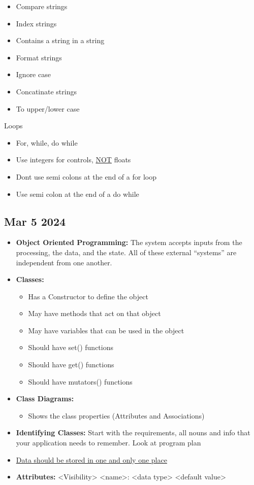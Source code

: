 \documentclass[12pt]{article}
\begin{document}
\begin{itemize}
			\item Compare strings 
			\item Index strings
			\item Contains a string in a string
			\item Format strings
			\item Ignore case
			\item Concatinate strings
			\item To upper/lower case
\end{itemize}

Loops

\begin{itemize}
		  \item For, while, do while 
		  \item Use integers for controls, \underline{NOT} floats
		  \item Dont use semi colons at the end of a for loop
		  \item Use semi colon at the end of a do while
\end{itemize}

\subsection*{Mar 5 2024}

\begin{itemize}
		  \item \textbf{Object Oriented Programming:} The system accepts inputs from 
		  		the processing, the data, and the state. All of these external ``systems''
				are independent from one another.
		  \item \textbf{Classes:}
		  		\begin{itemize}
					\item Has a Constructor to define the object
					\item May have methods that act on that object
					\item May have variables that can be used in the object
					\item Should have set() functions
					\item Should have get() functions
					\item Should have mutators() functions
				\end{itemize}
		  \item \textbf{Class Diagrams:}
		  		\begin{itemize}
					\item Shows the class properties (Attributes and Associations)
				\end{itemize}
		  \item \textbf{Identifying Classes:} Start with the requirements, all nouns and info
		  		that your application needs to remember. Look at program plan
		  \item \underline{Data should be stored in one and only one place}
		  \item \textbf{Attributes:} <Visibility> <name>: <data type> <default value>
\end{itemize}
\end{document}
